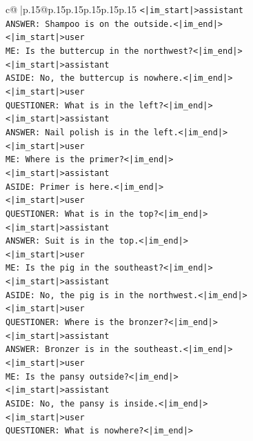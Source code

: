 \documentclass{article}
\begin{document}
{\begin{supertabular}{c@{$\;$}|p{.15\linewidth}@{}p{.15\linewidth}p{.15\linewidth}p{.15\linewidth}p{.15\linewidth}p{.15\linewidth}}
{{{\texttt{<|im\_start|>assistant} \\
\texttt{ANSWER: Shampoo is on the outside.<|im\_end|>} \\
\texttt{<|im\_start|>user} \\
\texttt{ME: Is the buttercup in the northwest?<|im\_end|>} \\
\texttt{<|im\_start|>assistant} \\
\texttt{ASIDE: No, the buttercup is nowhere.<|im\_end|>} \\
\texttt{<|im\_start|>user} \\
\texttt{QUESTIONER: What is in the left?<|im\_end|>} \\
\texttt{<|im\_start|>assistant} \\
\texttt{ANSWER: Nail polish is in the left.<|im\_end|>} \\
\texttt{<|im\_start|>user} \\
\texttt{ME: Where is the primer?<|im\_end|>} \\
\texttt{<|im\_start|>assistant} \\
\texttt{ASIDE: Primer is here.<|im\_end|>} \\
\texttt{<|im\_start|>user} \\
\texttt{QUESTIONER: What is in the top?<|im\_end|>} \\
\texttt{<|im\_start|>assistant} \\
\texttt{ANSWER: Suit is in the top.<|im\_end|>} \\
\texttt{<|im\_start|>user} \\
\texttt{ME: Is the pig in the southeast?<|im\_end|>} \\
\texttt{<|im\_start|>assistant} \\
\texttt{ASIDE: No, the pig is in the northwest.<|im\_end|>} \\
\texttt{<|im\_start|>user} \\
\texttt{QUESTIONER: Where is the bronzer?<|im\_end|>} \\
\texttt{<|im\_start|>assistant} \\
\texttt{ANSWER: Bronzer is in the southeast.<|im\_end|>} \\
\texttt{<|im\_start|>user} \\
\texttt{ME: Is the pansy outside?<|im\_end|>} \\
\texttt{<|im\_start|>assistant} \\
\texttt{ASIDE: No, the pansy is inside.<|im\_end|>} \\
\texttt{<|im\_start|>user} \\
\texttt{QUESTIONER: What is nowhere?<|im\_end|>} \\
}}}
\end{supertabular}}
\end{document}
